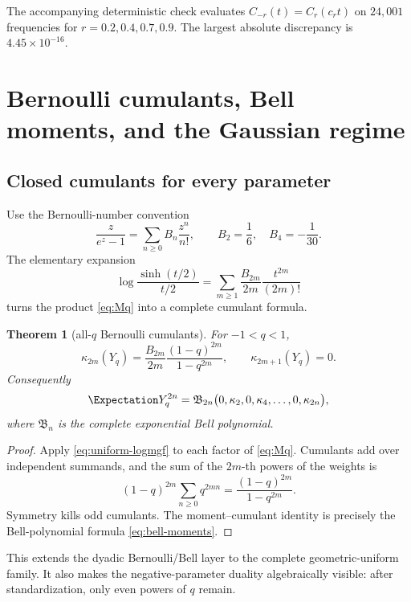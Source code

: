 \documentclass[11pt]{article}
\newtheorem{theorem}{Theorem}[section]
\theoremstyle{definition}
\theoremstyle{remark}
\begin{document}
The accompanying deterministic check evaluates $C_{-r}(t)=C_r(c_rt)$ on $24{,}001$ frequencies for $r=0.2,0.4,0.7,0.9$.  The largest absolute discrepancy is $4.45\times10^{-16}$.

\section{Bernoulli cumulants, Bell moments, and the Gaussian regime}

\subsection{Closed cumulants for every parameter}

Use the Bernoulli-number convention
\[
 \frac{z}{e^z-1}=\sum_{n\ge0}B_n\frac{z^n}{n!},
 \qquad B_2=\frac16,\quad B_4=-\frac1{30}.
\]
The elementary expansion
\begin{equation}\label{eq:uniform-logmgf}
 \log\frac{\sinh(t/2)}{t/2}
 =\sum_{m\ge1}\frac{B_{2m}}{2m}\frac{t^{2m}}{(2m)!}
\end{equation}
turns the product \cref{eq:Mq} into a complete cumulant formula.

\begin{theorem}[all-$q$ Bernoulli cumulants]\label{thm:cumulants}
For $-1<q<1$,
\begin{equation}\label{eq:cumulants}
 \kappa_{2m}(Y_q)
 =\frac{B_{2m}}{2m}\frac{(1-q)^{2m}}{1-q^{2m}},
 \qquad
 \kappa_{2m+1}(Y_q)=0.
\end{equation}
Consequently
\begin{equation}\label{eq:bell-moments}
 \Expectation Y_q^{2n}
 =\mathfrak B_{2n}\bigl(0,\kappa_2,0,\kappa_4,\ldots,0,\kappa_{2n}\bigr),
\end{equation}
where $\mathfrak B_n$ is the complete exponential Bell polynomial.
\end{theorem}

\begin{proof}
Apply \cref{eq:uniform-logmgf} to each factor of \cref{eq:Mq}.  Cumulants add over independent summands, and the sum of the $2m$-th powers of the weights is
\[
 (1-q)^{2m}\sum_{n\ge0}q^{2mn}
 =\frac{(1-q)^{2m}}{1-q^{2m}}.
\]
Symmetry kills odd cumulants.  The moment--cumulant identity is precisely the Bell-polynomial formula \cref{eq:bell-moments}.
\end{proof}

This extends the dyadic Bernoulli/Bell layer to the complete geometric-uniform family.  It also makes the negative-parameter duality algebraically visible: after standardization, only even powers of $q$ remain.
\end{document}

